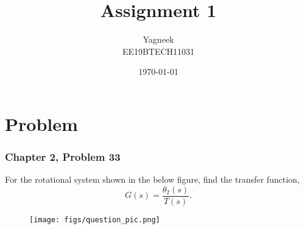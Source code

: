 \documentclass{beamer}
\title{Assignment 1}
\author{Yagneek\\EE19BTECH11031}
\date{\today}
\theoremstyle{remark}
\numberwithin{equation}{section}
\begin{document}
\begin{frame}
\titlepage
\end{frame}


\begin{frame}
\tableofcontents
\end{frame}
\section{Problem}
\begin{frame}
\frametitle{Chapter 2, Problem 33}
For the rotational system shown in the below figure, find the transfer function,
\begin{equation*}
    G(s) = \frac{\theta_2(s)}{T(s)}.
\end{equation*}

\begin{figure}
\centering
\texttt{[image: figs/question\_pic.png]}
\end{figure}

\end{frame}

\end{document}
